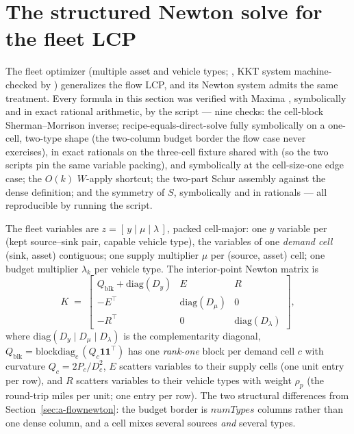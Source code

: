 \section{The structured Newton solve for the fleet LCP}
\label{sec:a-fleetnewton}

The fleet optimizer (multiple asset and vehicle types;
, KKT system machine-checked by
) generalizes the flow LCP, and its
Newton system admits the same treatment. Every formula in this section
was verified with Maxima \cite{maxima,macsyma}, symbolically and in exact
rational arithmetic, by the script
 --- nine checks: the cell-block
Sherman--Morrison inverse; recipe-equals-direct-solve fully symbolically
on a one-cell, two-type shape (the two-column budget border the flow case
never exercises), in exact rationals on the three-cell fixture shared with
 (so the two scripts pin the same variable
packing), and symbolically at the cell-size-one edge case; the $O(k)$
$W$-apply shortcut; the two-part Schur assembly against the dense
definition; and the symmetry of $S$, symbolically and in rationals ---
all reproducible by running the script.

The fleet variables are $z = [\,y \mid \mu \mid \lambda\,]$, packed
cell-major: one $y$ variable per (kept source--sink pair, capable vehicle
type), the variables of one \emph{demand cell} (sink, asset) contiguous;
one supply multiplier $\mu$ per (source, asset) cell; one budget
multiplier $\lambda_k$ per vehicle type. The interior-point Newton matrix
is
\[
K \;=\;
\begin{bmatrix}
Q_{\mathrm{blk}} + \mathrm{diag}(D_y) & E & R\\[2pt]
-E^\top & \mathrm{diag}(D_\mu) & 0\\[2pt]
-R^\top & 0 & \mathrm{diag}(D_\lambda)
\end{bmatrix},
\]
where $\mathrm{diag}(D_y \mid D_\mu \mid D_\lambda)$ is the
complementarity diagonal, $Q_{\mathrm{blk}} =
\mathrm{blockdiag}_c\,(Q_c \mathbf{1}\mathbf{1}^\top)$ has one
\emph{rank-one} block per demand cell $c$ with curvature
$Q_c = 2P_c/D_c^2$, $E$ scatters variables to their supply cells (one
unit entry per row), and $R$ scatters variables to their vehicle types
with weight $\rho_p$ (the round-trip miles per unit; one entry per row).
The two structural differences from Section~\ref{sec:a-flownewton}: the
budget border is $\mathit{numTypes}$ columns rather than one dense
column, and a cell mixes several sources \emph{and} several types.

